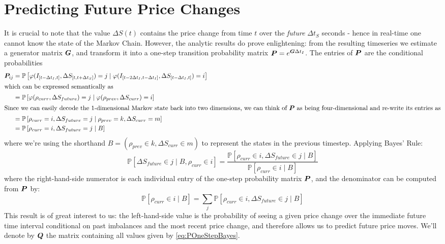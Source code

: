 \section{Predicting Future Price Changes}
It is crucial to note that the value $\Delta S(t)$ contains the price change from time $t$ over the \textit{future} $\Delta t_S$ seconds - hence in real-time one cannot know the state of the Markov Chain. However, the analytic results do prove enlightening: from the resulting timeseries we estimate a generator matrix $\boldsymbol{G}$, and transform it into a one-step transition probability matrix $\boldsymbol{P} = e^{\boldsymbol{G}\Delta t_I}$. The entries of $\boldsymbol{P}$ are the conditional probabilities 
\begin{align}
\boldsymbol{P}_{ij} & = \mathbb{P}\left[ \varphi( I_{[t-\Delta t_I, t]}, \Delta S_{[t,t+\Delta t_S]}) = j \; | \; \varphi( I_{[t-2\Delta t_I, t-\Delta t_I]}, \Delta S_{[t-\Delta t_I, t]} ) = i \right] \label{eq:POneStepUgly} \\
\intertext{which can be expressed semantically as}
& = \mathbb{P}\left[ \varphi( \rho_{curr}, \Delta S_{future}) = j \; | \; \varphi( \rho_{prev}, \Delta S_{curr} ) = i \right] \label{eq:POneStepNice} \\
\intertext{Since we can easily decode the 1-dimensional Markov state back into two dimensions, we can think of $\boldsymbol{P}$ as being four-dimensional and re-write its entries as}
& = \mathbb{P}\left[ \rho_{curr} = i,  \Delta S_{future} = j \; | \; \rho_{prev} = k, \Delta S_{curr} = m \right] \\
& = \mathbb{P}\left[ \rho_{curr} = i,  \Delta S_{future} = j \; | \; B \right]
\end{align}
where we're using the shorthand $B = (\rho_{prev} \in k, \Delta S_{curr} \in m)$ to represent the states in the previous timestep. Applying Bayes' Rule:
\begin{equation}\label{eq:POneStepBayes}
\mathbb{P}\left[ \Delta S_{future} \in j \; | \; B, \rho_{curr} \in i \right] = \dfrac{\mathbb{P}\left[ \rho_{curr} \in i, \Delta S_{future} \in j \; | \; B \right]}{\mathbb{P}\left[ \rho_{curr} \in i \; | \; B \right]}
\end{equation}
where the right-hand-side numerator is each individual entry of the one-step probability matrix $\boldsymbol{P}$, and the denominator can be computed from $\boldsymbol{P}$ by:
\begin{equation}\label{eq:POneStepBayesDenom}
\mathbb{P}\left[ \rho_{curr} \in i \; | \; B \right] = \sum\limits_j \mathbb{P}\left[ \rho_{curr} \in i,  \Delta S_{future} \in j \; | \; B \right]
\end{equation}
This result is of great interest to us: the left-hand-side value is the probability of seeing a given price change over the immediate future time interval conditional on past imbalances and the most recent price change, and therefore allows us to predict future price moves. We'll denote by $\boldsymbol{Q}$ the matrix containing all values given by \eqref{eq:POneStepBayes}.

